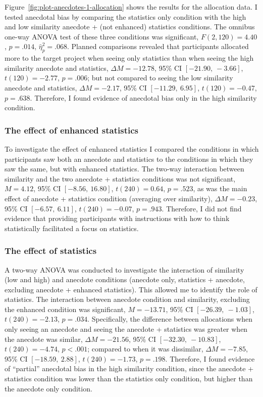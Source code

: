 \documentclass[a4paper, nobind, dvipsnames]{templates/ociamthesis}
\theoremstyle{definition}
\theoremstyle{definition}
\theoremstyle{definition}
\theoremstyle{definition}
\theoremstyle{remark}
\begin{document}
Figure~\ref{fig:plot-anecdotes-1-allocation} shows the results for the
allocation data. I tested anecdotal bias by comparing the statistics only
condition with the high and low similarity anecdote + (not enhanced) statistics
conditions. The omnibus one-way ANOVA test of these three conditions was
significant, \(F(2, 120) = 4.40\), \(p = .014\), \(\hat{\eta}^2_p = .068\). Planned comparisons
revealed that participants allocated more to the target project when seeing only
statistics than when seeing the high similarity anecdote and statistics,
\(\Delta M = -12.78\), 95\% CI \([-21.90,~-3.66]\), \(t(120) = -2.77\), \(p = .006\); but not compared
to seeing the low similarity anecdote and statistics,
\(\Delta M = -2.17\), 95\% CI \([-11.29,~6.95]\), \(t(120) = -0.47\), \(p = .638\). Therefore, I
found evidence of anecdotal bias only in the high similarity condition.

\subsubsection{The effect of enhanced statistics}

To investigate the effect of enhanced statistics I compared the conditions in
which participants saw both an anecdote and statistics to the conditions in
which they saw the same, but with enhanced statistics. The two-way interaction
between similarity and the two anecdote + statistics conditions was not
significant, \(M = 4.12\), 95\% CI \([-8.56,~16.80]\), \(t(240) = 0.64\), \(p = .523\), as
was the main effect of anecdote + statistics condition (averaging over
similarity), \(\Delta M = -0.23\), 95\% CI \([-6.57,~6.11]\), \(t(240) = -0.07\), \(p = .943\). Therefore, I
did not find evidence that providing participants with instructions with how to
think statistically facilitated a focus on statistics.

\subsubsection{The effect of statistics}

A two-way ANOVA was conducted to investigate the interaction of similarity (low
and high) and anecdote conditions (anecdote only, statistics + anecdote,
excluding anecdote + enhanced statistics). This allowed me to identify the role
of statistics. The interaction between anecdote condition and similarity,
excluding the enhanced condition was significant,
\(M = -13.71\), 95\% CI \([-26.39,~-1.03]\), \(t(240) = -2.13\), \(p = .034\). Specifically, the
difference between allocations when only seeing an anecdote and seeing the
anecdote + statistics was greater when the anecdote was similar,
\(\Delta M = -21.56\), 95\% CI \([-32.30,~-10.83]\), \(t(240) = -4.74\), \(p < .001\); compared to when it
was dissimilar, \(\Delta M = -7.85\), 95\% CI \([-18.59,~2.88]\), \(t(240) = -1.73\), \(p = .198\).
Therefore, I found evidence of ``partial'' anecdotal bias in the high similarity
condition, since the anecdote + statistics condition was lower than the
statistics only condition, but higher than the anecdote only condition.
\end{document}
